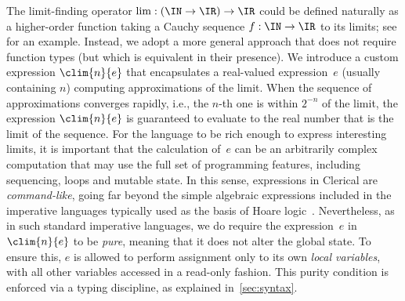 The limit-finding operator $\lim : (\IN \to \IR) \to \IR$ could be defined naturally as a higher-order function taking a Cauchy sequence $f: \IN \to \IR$ to its limits; see \cite{park23} for an example. 
Instead, we adopt a more general approach that does not require  function types (but which is equivalent in their presence). 
We introduce a custom expression $\clim{n}{e}$ that encapsulates a real-valued expression~$e$ (usually containing $n$) computing approximations of the limit.
%
When the sequence of approximations converges rapidly, i.e., the $n$-th one is within $2^{-n}$ of the limit, the expression $\clim{n}{e}$ is guaranteed to evaluate to the real number that is the limit of the sequence.
%
For the language to be rich enough to express interesting limits, it is important that the calculation of~$e$ can be an arbitrarily complex computation that may use the full set of programming features, including sequencing, loops and mutable state. In this sense, expressions in  Clerical are \emph{command-like}, 
going far beyond the simple algebraic expressions included in the imperative languages typically used as the basis of Hoare logic~\cite{apt19:_fifty_years_hoare_logic}. Nevertheless,  
as in such standard imperative languages, we do require the 
expression~$e$ 
in $\clim{n}{e}$ to be \emph{pure}, meaning that it does not alter the global state. To ensure this, $e$ is  allowed 
to perform assignment only to its own \emph{local variables}, with all other variables accessed in a read-only fashion.
This purity condition is enforced via a typing discipline, as explained in~\cref{sec:syntax}.

